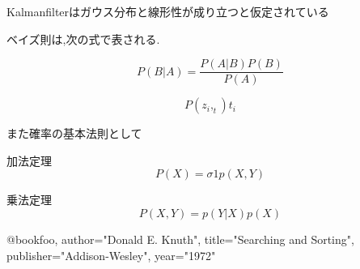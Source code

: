 \documentclass[12pt]{jsarticle}
\begin{document}
Kalmanfilterはガウス分布と線形性が成り立つと仮定されている


ベイズ則は,次の式で表される.

\begin{equation}
  P(B|A) = \frac{P(A|B)P(B)}{P(A)}
\end{equation}

\begin{equation}
 P(z_i,_t){t_i}
\end{equation}

また確率の基本法則として

加法定理
\begin{equation}
  P(X)=\sigma{1}{p(X,Y)}
\end{equation}

乗法定理
\begin{equation}
  P(X,Y)=p(Y|X)p(X)
\end{equation}

@book{foo,
  author="Donald E. Knuth",
  title="Searching and Sorting",
  publisher="Addison-Wesley",
  year="1972"}
\end{document}
